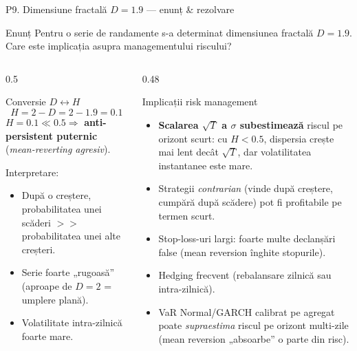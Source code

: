 \documentclass[9pt, aspectratio=169, t]{beamer}
\begin{document}
\begin{frame}[shrink=22]{P9. Dimensiune fractală $D=1.9$ --- enunț \& rezolvare}
\begin{block}{Enunț}
Pentru o serie de randamente s-a determinat dimensiunea fractală $D=1.9$. Care este implicația asupra managementului riscului?
\end{block}
\begin{columns}[T]
\begin{column}{0.5\textwidth}
\begin{block}{Conversie $D \leftrightarrow H$}
\[
H = 2 - D = 2 - 1.9 = \mathbf{0.1}
\]
$H = 0.1 \ll 0.5\Rightarrow$ \textbf{anti-persistent puternic} (\emph{mean-reverting agresiv}).

Interpretare:
\begin{itemize}\setlength{\itemsep}{1pt}
    \item După o creștere, probabilitatea unei scăderi $>>$ probabilitatea unei alte creșteri.
    \item Serie foarte „rugoasă'' (aproape de $D=2$ = umplere plană).
    \item Volatilitate intra-zilnică foarte mare.
\end{itemize}
\end{block}
\end{column}
\begin{column}{0.48\textwidth}
\begin{block}{Implicații risk management}
\begin{itemize}\setlength{\itemsep}{1pt}
    \item \textbf{Scalarea $\sqrt T$ a $\sigma$ subestimează} riscul pe orizont scurt: cu $H<0.5$, dispersia crește mai lent decât $\sqrt T$, dar volatilitatea instantanee este mare.
    \item Strategii \emph{contrarian} (vinde după creștere, cumpără după scădere) pot fi profitabile pe termen scurt.
    \item Stop-loss-uri largi: foarte multe declanșări false (mean reversion înghite stopurile).
    \item Hedging frecvent (rebalansare zilnică sau intra-zilnică).
    \item VaR Normal/GARCH calibrat pe agregat poate \emph{supraestima} riscul pe orizont multi-zile (mean reversion „absoarbe'' o parte din risc).
\end{itemize}
\end{block}
\end{column}
\end{columns}
\end{frame}
\end{document}
